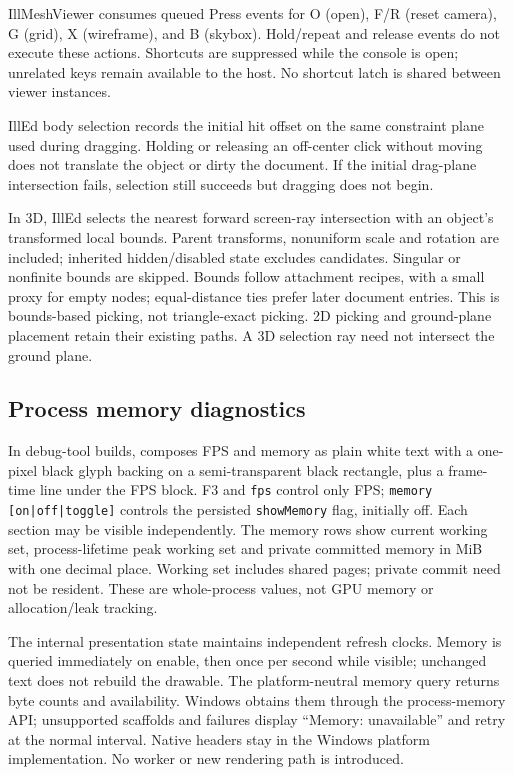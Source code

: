 IllMeshViewer consumes queued Press events for O (open), F/R (reset camera),
G (grid), X (wireframe), and B (skybox). Hold/repeat and release events do not
execute these actions. Shortcuts are suppressed while the console is open;
unrelated keys remain available to the host. No shortcut latch is shared
between viewer instances.

IllEd body selection records the initial hit offset on the same constraint plane
used during dragging. Holding or releasing an off-center click without moving
does not translate the object or dirty the document. If the initial drag-plane
intersection fails, selection still succeeds but dragging does not begin.

In 3D, IllEd selects the nearest forward screen-ray intersection with an
object's transformed local bounds. Parent transforms, nonuniform scale and
rotation are included; inherited hidden/disabled state excludes candidates.
Singular or nonfinite bounds are skipped. Bounds follow attachment recipes,
with a small proxy for empty nodes; equal-distance ties prefer later document
entries. This is bounds-based picking, not triangle-exact picking. 2D picking
and ground-plane placement retain their existing paths. A 3D selection ray
need not intersect the ground plane.


\subsection{Process memory diagnostics}
In debug-tool builds,  composes FPS and memory as plain
white text with a one-pixel black glyph backing on a semi-transparent black
rectangle, plus a frame-time line under the FPS block. F3 and \texttt{fps}
control only FPS;
\texttt{memory [on|off|toggle]} controls the persisted \texttt{showMemory}
flag, initially off. Each section may be visible independently. The memory
rows show current working set, process-lifetime peak working set and private
committed memory in MiB with one decimal place. Working set includes shared
pages; private commit need not be resident. These are whole-process values,
not GPU memory or allocation/leak tracking.

The internal presentation state maintains independent refresh clocks. Memory
is queried immediately on enable, then once per second while visible; unchanged
text does not rebuild the drawable. The platform-neutral memory query returns
byte counts and availability. Windows obtains them through the process-memory
API; unsupported scaffolds and failures display ``Memory: unavailable'' and
retry at the normal interval. Native headers stay in the Windows platform
implementation. No worker or new rendering path is introduced.
